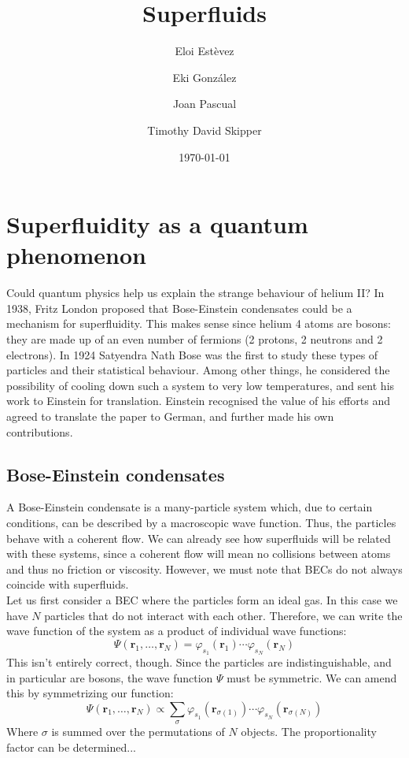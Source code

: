 \documentclass{article}
\title{Superfluids}
\author{Eloi Estèvez \and Eki González \and Joan Pascual \and Timothy David Skipper}
\date{\today}
\begin{document}
\maketitle
\begin{abstract}
\end{abstract}

\tableofcontents
\newpage


\section{Superfluidity as a quantum phenomenon}

Could quantum physics help us explain the strange behaviour of helium II?  In 1938, Fritz London proposed that Bose-Einstein condensates could be a mechanism for superfluidity.  This makes sense since helium 4 atoms are bosons: they are made up of an even number of fermions (2 protons, 2 neutrons and 2 electrons).  In 1924 Satyendra Nath Bose was the first to study these types of particles and their statistical behaviour.  Among other things, he considered the possibility of cooling down such a system to very low temperatures, and sent his work to Einstein for translation.  Einstein recognised the value of his efforts and agreed to translate the paper to German, and further made his own contributions.

\subsection{Bose-Einstein condensates}

A Bose-Einstein condensate is a many-particle system which, due to certain
conditions, can be described by a macroscopic wave function.  Thus, the particles
behave with a coherent flow.  We can already see how superfluids will be related
with these systems, since a coherent flow will mean no collisions between atoms
and thus no friction or viscosity.  However, we must note that BECs do not always
coincide with superfluids.
\\

Let us first consider a BEC where the particles form an ideal gas.  In this case we have $N$ particles that do not interact with each other.  Therefore, we can write the wave function of the system as a product of
individual wave functions:
\[\Psi(\mathbf{r}_1, \dots, \mathbf{r}_N) =
    \varphi_{s_1}(\mathbf{r}_1)\dotsb\varphi_{s_N}(\mathbf{r}_N)\]
This isn't entirely correct, though.  Since the particles are indistinguishable, and in particular are bosons, the wave function $\Psi$ must be symmetric.  We can amend this by symmetrizing our function:
\[\Psi(\mathbf{r}_1, \dots, \mathbf{r}_N) \propto \sum_{\sigma}
        \varphi_{s_1}(\mathbf{r}_{\sigma(1)})\dotsb
        \varphi_{s_N}(\mathbf{r}_{\sigma(N)})\]
Where $\sigma$ is summed over the permutations of $N$ objects.  The proportionality factor can be determined...
\\
\end{document}
